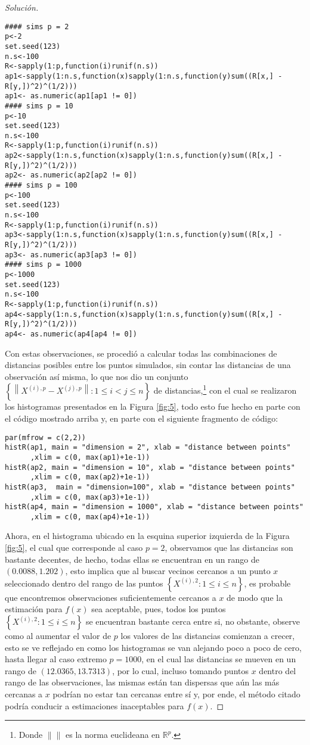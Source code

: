 \documentclass[10.5pt,notitlepage]{article}
\newenvironment{solucion}
  {\begin{proof}[Solución]}
  {\end{proof}}
\newcommand{\RR}{\mathbb{R}}
\newcommand{\norm}[1]{\left\| #1 \right\|}
\newcommand{\kis}[1]{\left\{ #1 \right\}}
\theoremstyle{plain}
\begin{document}
\begin{solucion}
\begin{verbatim}
#### sims p = 2
p<-2 
set.seed(123)
n.s<-100 
R<-sapply(1:p,function(i)runif(n.s)) 
ap1<-sapply(1:n.s,function(x)sapply(1:n.s,function(y)sum((R[x,] - R[y,])^2)^(1/2)))
ap1<- as.numeric(ap1[ap1 != 0])
#### sims p = 10
p<-10 
set.seed(123)
n.s<-100 
R<-sapply(1:p,function(i)runif(n.s)) 
ap2<-sapply(1:n.s,function(x)sapply(1:n.s,function(y)sum((R[x,] - R[y,])^2)^(1/2)))
ap2<- as.numeric(ap2[ap2 != 0])
#### sims p = 100
p<-100
set.seed(123)
n.s<-100 
R<-sapply(1:p,function(i)runif(n.s)) 
ap3<-sapply(1:n.s,function(x)sapply(1:n.s,function(y)sum((R[x,] - R[y,])^2)^(1/2)))
ap3<- as.numeric(ap3[ap3 != 0])
#### sims p = 1000
p<-1000
set.seed(123)
n.s<-100 
R<-sapply(1:p,function(i)runif(n.s)) 
ap4<-sapply(1:n.s,function(x)sapply(1:n.s,function(y)sum((R[x,] - R[y,])^2)^(1/2)))
ap4<- as.numeric(ap4[ap4 != 0])
\end{verbatim}
Con estas observaciones, se procedió a calcular todas las combinaciones de distancias posibles entre los puntos simulados, sin contar las distancias de una observación así misma, lo que nos dio un conjunto \(\kis{\norm{X^{(i),p} - X^{(j),p}}: 1 \leq i < j \leq n}\) de distancias,\footnote{Donde \(\norm{}\) es la norma euclideana en \(\RR^p\).} con el cual se realizaron los histogramas presentados en la Figura \ref{fig:5}, todo esto fue hecho en parte con el código mostrado arriba y, en parte con el siguiente fragmento de código:
\begin{verbatim}
par(mfrow = c(2,2))
histR(ap1, main = "dimension = 2", xlab = "distance between points"
      ,xlim = c(0, max(ap1)+1e-1))
histR(ap2, main = "dimension = 10", xlab = "distance between points"
      ,xlim = c(0, max(ap2)+1e-1))
histR(ap3,  main = "dimension=100", xlab = "distance between points"
      ,xlim = c(0, max(ap3)+1e-1))
histR(ap4, main = "dimension = 1000", xlab = "distance between points"
      ,xlim = c(0, max(ap4)+1e-1))
\end{verbatim}
Ahora, en el histograma ubicado en la esquina superior izquierda de la Figura \ref{fig:5}, el cual que corresponde al caso \(p=2\), observamos que las distancias son bastante decentes, de hecho, todas ellas se encuentran en un rango de \((0.0088, 1.202)\), esto implica que al buscar vecinos cercanos a un punto \(x\) seleccionado dentro del rango de las puntos \(\kis{X^{(i),2}: 1 \leq i \leq n}\), es probable que encontremos observaciones suficientemente cercanos a \(x\) de modo que la estimación para \(f(x)\) sea aceptable, pues, todos los puntos \(\kis{X^{(i),2}: 1 \leq i \leq n}\) se encuentran bastante cerca entre si, no obstante, observe como al aumentar el valor de \(p\) los valores de las distancias comienzan a crecer, esto se ve reflejado en como los histogramas se van alejando poco a poco de cero, hasta llegar al caso extremo \(p = 1000\), en el cual las distancias se mueven en un rango de \( (12.0365, 13.7313)\), por lo cual, incluso tomando puntos \(x\) dentro del rango de las observaciones, las mismas están tan dispersas que aún las más cercanas a \(x\) podrían no estar tan cercanas entre sí y, por ende, el método citado podría conducir a estimaciones inaceptables para \(f(x)\).  

\end{solucion}
\end{document}
